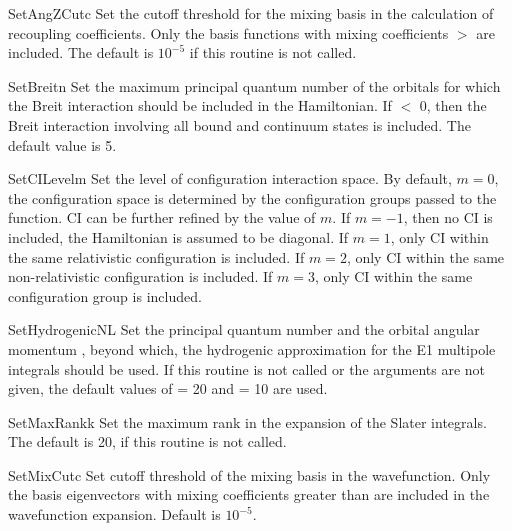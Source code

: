 \begin{fundesc}{SetAngZCut}{c}
Set the cutoff threshold for the mixing basis in the calculation of recoupling
coefficients. Only the basis functions with mixing coefficients $>$ are
included. The default is $10^{-5}$ if this routine is not called.
\end{fundesc}

\begin{fundesc}{SetBreit}{n}
Set the maximum principal quantum number of the orbitals for which the
Breit interaction should be included in the Hamiltonian. If  $<$ 0,
then the Breit interaction involving all bound and continuum states is
included. The default value is 5.
\end{fundesc}

\begin{fundesc}{SetCILevel}{m}
Set the level of configuration interaction space. By default, $m=0$, the
configuration space is determined by the configuration groups passed to the
 function. CI can be further refined by the value of $m$. If
$m=-1$, then no CI is included, the Hamiltonian is assumed to be diagonal. If
$m=1$, only CI within the same relativistic configuration is included. If
$m=2$, only CI within the same non-relativistic configuration is included. If
$m=3$, only CI within the same configuration group is included.
\end{fundesc}

\begin{fundesc}{SetHydrogenicNL}{}
Set the principal quantum number  and the orbital angular momentum
, beyond which, the hydrogenic approximation for the E1 multipole
integrals should be used. If this routine is not called or the arguments are not
given, the default values of  = 20 and  = 10 are used. 
\end{fundesc}

\begin{fundesc}{SetMaxRank}{k}
Set the maximum rank in the expansion of the Slater integrals. The default is
20, if this routine is not called.
\end{fundesc}

\begin{fundesc}{SetMixCut}{c}
Set cutoff threshold of the mixing basis in the wavefunction. Only the basis
eigenvectors with mixing coefficients greater than  are included in the
wavefunction expansion. Default is $10^{-5}$.
\end{fundesc}

